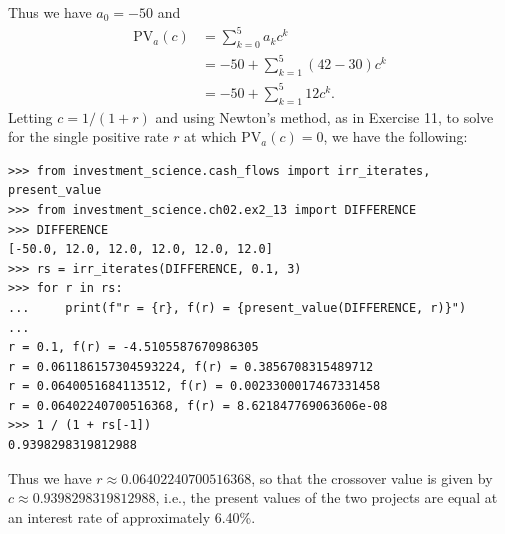 \begin{itemize}
        Thus we have $a_0 = -50$ and
        \begin{equation*}
            \begin{split}
                \text{PV}_a(c) &= \sum_{k=0}^5 a_k c^k \\
                &= -50 + \sum_{k=1}^5 (42 - 30) c^k \\
                &= -50 + \sum_{k=1}^5 12 c^k.
            \end{split}
        \end{equation*}
        Letting $c = 1 / (1 + r)$ and using Newton's method, as in Exercise 11,
        to solve for the single positive rate $r$ at which
        $\text{PV}_a(c) = 0$, we have the following:
        \begin{lstlisting}
>>> from investment_science.cash_flows import irr_iterates, present_value
>>> from investment_science.ch02.ex2_13 import DIFFERENCE
>>> DIFFERENCE
[-50.0, 12.0, 12.0, 12.0, 12.0, 12.0]
>>> rs = irr_iterates(DIFFERENCE, 0.1, 3)
>>> for r in rs:
...     print(f"r = {r}, f(r) = {present_value(DIFFERENCE, r)}")
...
r = 0.1, f(r) = -4.5105587670986305
r = 0.061186157304593224, f(r) = 0.3856708315489712
r = 0.0640051684113512, f(r) = 0.0023300017467331458
r = 0.06402240700516368, f(r) = 8.621847769063606e-08
>>> 1 / (1 + rs[-1])
0.9398298319812988
        \end{lstlisting}
        Thus we have $r \approx 0.06402240700516368$, so that the crossover
        value is given by $c \approx 0.9398298319812988$, i.e., the present
        values of the two projects are equal at an interest rate of
        approximately 6.40\%.
\end{itemize}
